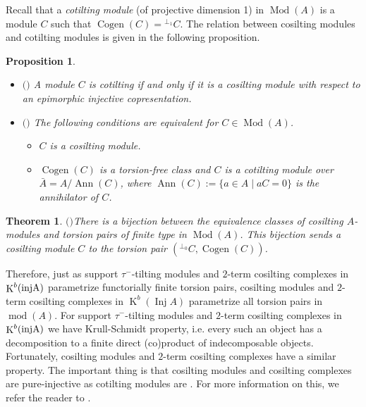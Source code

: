 \documentclass[12pt]{amsart}
\numberwithin{equation}{section}
\newtheorem{theorem}[lemma]{Theorem}
\newtheorem{proposition}[lemma]{Proposition}
\theoremstyle{definition}
\DeclareMathOperator{\Mod}{Mod}
\DeclareMathOperator{\modd}{mod}
\DeclareMathOperator{\K}{K}
\DeclareMathOperator{\Cogen}{Cogen}
\DeclareMathOperator{\Inj}{Inj}
\DeclareMathOperator{\Ann}{Ann}
\newtheorem*{theorem 0*}{Theorem}
\newtheorem*{theorem a*}{Theorem A}
\newtheorem*{theorem b*}{Theorem B}
\numberwithin{diagram}{section}
\begin{document}
Recall that a {\it cotilting module} (of projective dimension 1) in $\Mod(A)$ is a module $C$ such that $\Cogen(C)={}^{\bot_1}C$. The relation between cosilting modules and cotilting modules is given in the following proposition.
	
\begin{proposition}\label{2.8}
\begin{itemize}
\item[(1)] $($\cite{BP}$)$ A module $C$ is cotilting if and only if it is a cosilting module with respect to an epimorphic injective copresentation.
\item[(2)] $($\cite{ZW}$)$ The following conditions are equivalent for $C\in \Mod(A)$.
		\begin{itemize}
		\item[(a)] $C$ is a cosilting module.
		\item[(b)] $\Cogen(C)$ is a torsion-free class and $C$ is a cotilting module over $\bar{A}=A/\Ann{(C)}$, where $\Ann(C):=\{a\in A\mid aC=0\}$ is the annihilator of $C$.
		\end{itemize}
	\end{itemize}
\end{proposition}
	
\begin{theorem}$($\cite{ZW}$)$\label{2.9}
There is a bijection between the equivalence classes of cosilting $A$-modules and torsion pairs of finite type in $\Mod(A)$. This bijection sends a cosilting module $C$ to the torsion pair $(^{\bot_0}C,\Cogen(C))$.
\end{theorem}
	
Therefore, just as support $\tau^-$-tilting modules and $2$-term cosilting complexes in $\K^b(\rm inj A)$ parametrize functorially finite torsion pairs, cosilting modules and $2$-term cosilting complexes in $\K^b(\Inj A)$ parametrize all torsion pairs in $\modd(A)$. For support $\tau^-$-tilting modules and $2$-term cosilting complexes in $\K^b(\rm inj A)$ we have Krull-Schmidt property, i.e. every such an object has a decomposition to a finite direct (co)product of indecomposable objects. Fortunately, cosilting modules and $2$-term cosilting complexes have a similar property.
The important thing is that cosilting modules and cosilting complexes are pure-injective \cite{MV} as cotilting modules are \cite{B}.
For more information on this, we refer the reader to \cite{ALS1}.
\end{document}

